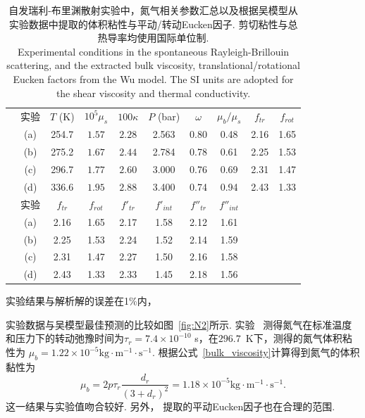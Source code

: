 \begin{table}
	\centering
	\caption{自发瑞利-布里渊散射实验中，氮气相关参数汇总以及根据吴模型从实验数据中提取的体积粘性与平动/转动Eucken因子. 剪切粘性与总热导率均使用国际单位制. \\
		Experimental conditions in the spontaneous Rayleigh-Brillouin scattering, and the extracted bulk viscosity, translational/rotational Eucken factors from the Wu model. The SI units are adopted for the shear viscosity and thermal conductivity.} %
	\label{table:N2}
	\begin{tabular}{cccccccccc}
		\hline\hline
		& 实验 & $T$ (K)
		&  $10^5\mu_s $
		&  $100\kappa $  &  $P$ (bar)  & $\omega$ & $\mu_b/\mu_s$ & $f_{tr}$ & $f_{rot}$  \\
		& (a) &254.7 & $1.57$  & $2.28$ & 2.563  &0.80 &0.48   &2.16 &1.65 \\
		& (b) &275.2 & $1.67$  & $2.44$ & 2.784  &0.78 &0.61   &2.25 &1.53 \\
		& (c) &296.7 & $1.77$  & $2.60$ & 3.000  &0.76 &0.69   &2.31 &1.47\\
		& (d) & 336.6 & $1.95$ & $2.88$ & 3.400  &0.74 &0.94  &2.43 &1.33\\
		\hline\hline
				\hline	
				& 实验	& $f_{tr}$ & $f_{rot}$ & $f'_{tr}$ & $f'_{int}$  & $f''_{tr}$ & $f''_{int}$ \\
				& (a) &2.16 &1.65 &2.17 &1.58 & 2.12 & 1.61  \\
				& (b) &2.25 &1.53  &2.24 & 1.52 &2.14 &1.59 \\
				& (c) &2.31 &1.47  &2.27 &1.50 &2.16 &1.58 \\
				& (d) &2.43 &1.33 &2.33 &1.45 &2.18 &1.56	
			\\	\hline\hline
	\end{tabular}
\end{table}


实验结果与解析解的误差在1\%内，

实验数据与吴模型最佳预测的比较如图~\ref{fig:N2}所示. 实验~\cite{Lambert1977} 测得氮气在标准温度和压力下的转动弛豫时间为$\tau_r=7.4\times10^{-10}$ s，在$296.7$~K下，测得的氮气体积粘性为 $\mu_b=1.22\times10^{-5}\operatorname{kg\cdot{m^{-1}}\cdot{s^{-1}}}$. 根据公式~\eqref{bulk_viscosity}计算得到氮气的体积黏性为
\begin{equation*}
\mu_b=2p\tau_r\frac{d_r}{(3+d_r)^2}
=1.18\times10^{-5}\operatorname{kg\cdot{m^{-1}}\cdot{s^{-1}}}.
\end{equation*}
这一结果与实验值吻合较好. 另外， 提取的平动Eucken因子也在合理的范围.

